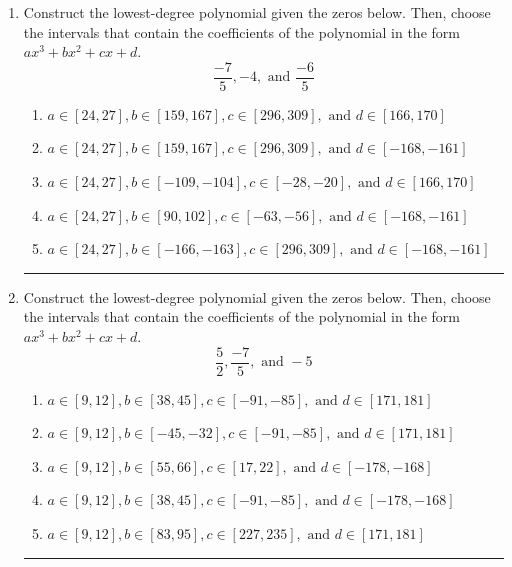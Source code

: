 \documentclass[14pt]{extbook}
\newcommand{\litem}[1]{\item#1\hspace*{-1cm}\rule{\textwidth}{0.4pt}}
\begin{document}
\begin{enumerate}
\litem{
Construct the lowest-degree polynomial given the zeros below. Then, choose the intervals that contain the coefficients of the polynomial in the form $ax^3+bx^2+cx+d$.\[ \frac{-7}{5}, -4, \text{ and } \frac{-6}{5} \]\begin{enumerate}[label=\Alph*.]
\item \( a \in [24, 27], b \in [159, 167], c \in [296, 309], \text{ and } d \in [166, 170] \)
\item \( a \in [24, 27], b \in [159, 167], c \in [296, 309], \text{ and } d \in [-168, -161] \)
\item \( a \in [24, 27], b \in [-109, -104], c \in [-28, -20], \text{ and } d \in [166, 170] \)
\item \( a \in [24, 27], b \in [90, 102], c \in [-63, -56], \text{ and } d \in [-168, -161] \)
\item \( a \in [24, 27], b \in [-166, -163], c \in [296, 309], \text{ and } d \in [-168, -161] \)

\end{enumerate} }
\litem{
Construct the lowest-degree polynomial given the zeros below. Then, choose the intervals that contain the coefficients of the polynomial in the form $ax^3+bx^2+cx+d$.\[ \frac{5}{2}, \frac{-7}{5}, \text{ and } -5 \]\begin{enumerate}[label=\Alph*.]
\item \( a \in [9, 12], b \in [38, 45], c \in [-91, -85], \text{ and } d \in [171, 181] \)
\item \( a \in [9, 12], b \in [-45, -32], c \in [-91, -85], \text{ and } d \in [171, 181] \)
\item \( a \in [9, 12], b \in [55, 66], c \in [17, 22], \text{ and } d \in [-178, -168] \)
\item \( a \in [9, 12], b \in [38, 45], c \in [-91, -85], \text{ and } d \in [-178, -168] \)
\item \( a \in [9, 12], b \in [83, 95], c \in [227, 235], \text{ and } d \in [171, 181] \)


\end{enumerate}}
\end{enumerate}
\end{document}
